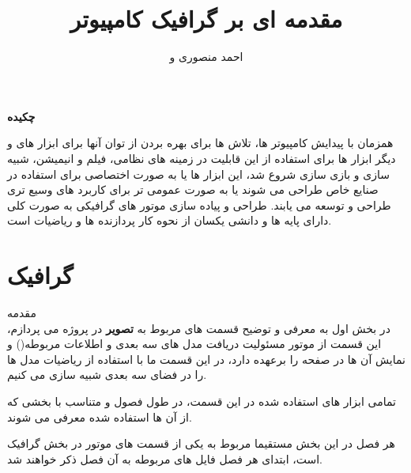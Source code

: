 \documentclass[a4paper, 12pt]{book}
\title{ مقدمه ای بر گرافیک کامپیوتر}
\author{احمد منصوری و \lr{\textsf{\textbf{peter shirley}}}}
\date{\lr{December 21, 2009}}
\makeatletter
\renewcommand\@endpart{\vfil
              \if@twoside
                \null
                \thispagestyle{empty}%
                \newpage
              \fi
              \if@tempswa
                \twocolumn
              \fi}
\makeatother
\begin{document}
\maketitle
\let\cleardoublepage\clearpage

\huge\textbf{چکیده}
\normalsize
\begin{flushright}
  همزمان با پیدایش کامپیوتر ها، تلاش ها برای بهره بردن از توان آنها برای ابزار های  و دیگر ابزار ها برای
  استفاده از این قابلیت در زمینه های نظامی، فیلم و انیمیشن، شبیه سازی و بازی سازی شروع شد، این ابزار ها یا به صورت
  اختصاصی برای استفاده در صنایع خاص طراحی می شوند یا به صورت عمومی تر برای کاربرد های وسیع تری طراحی و توسعه می یابند.
   طراحی و پیاده سازی موتور های گرافیکی به صورت کلی دارای پایه ها و دانشی یکسان از نحوه کار پردازنده ها و ریاضیات است.

\end{flushright}


\begingroup
  \hypersetup{hidelinks}
  \tableofcontents
\endgroup

\makeatletter
\renewcommand\@endpart{\vfil
              \if@twoside
                \null
                \thispagestyle{empty}%
                \newpage
              \fi
              \if@tempswa
                \twocolumn
              \fi}
\makeatother

\part{گرافیک}

\huge
    مقدمه \\

\vspace*{2cm}
\noindent
\normalsize
     در بخش اول به معرفی و توضیح قسمت های مربوط به \textbf{تصویر} در پروژه می پردازم،
     این قسمت از موتور مسئولیت دریافت مدل های سه بعدی و اطلاعات مربوطه()
     و نمایش آن ها در صفحه را برعهده دارد، در این قسمت ما با استفاده از ریاضیات مدل ها را در فضای سه بعدی شبیه سازی می کنیم.\par
     تمامی ابزار های استفاده شده در این  قسمت، در طول فصول و متناسب با بخشی که از آن ها استفاده شده معرفی می شوند.\par
     هر فصل در این بخش مستقیما مربوط به یکی از قسمت های موتور در بخش گرافیک است، ابتدای هر فصل فایل های مربوطه به آن فصل ذکر خواهند شد.

\chapter{}
\newpage
\end{document}
